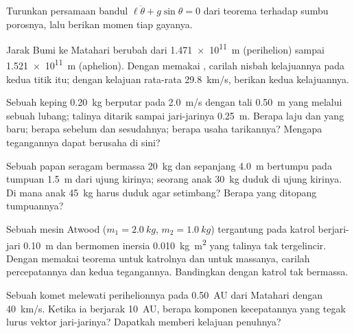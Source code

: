 \begin{exercise}[$\star\star$]\label{exo:b1:angular-momentum:5}
Turunkan persamaan bandul $\ell\ddot\theta + g\sin\theta = 0$ dari
teorema  terhadap sumbu porosnya, lalu berikan momen tiap
gayanya.
\end{exercise}

\begin{exercise}[$\star\star$]\label{exo:b1:angular-momentum:6}
Jarak Bumi ke Matahari berubah dari \qty{1.471e11}{m} (perihelion)
sampai \qty{1.521e11}{m} (aphelion). Dengan memakai ,
carilah nisbah kelajuannya pada kedua titik itu; dengan kelajuan
rata-rata \qty{29.8}{km/s}, berikan kedua kelajuannya.
\end{exercise}

\begin{exercise}[$\star\star$]\label{exo:b1:angular-momentum:7}
Sebuah keping \qty{0.20}{kg} berputar pada \qty{2.0}{m/s} dengan tali
\qty{0.50}{m} yang melalui sebuah lubang; talinya ditarik sampai
jari-jarinya \qty{0.25}{m}. Berapa laju dan  yang
baru; berapa  sebelum dan sesudahnya; berapa usaha
tarikannya? Mengapa tegangannya dapat berusaha di sini?
\end{exercise}

\begin{exercise}[$\star\star$]\label{exo:b1:angular-momentum:8}
Sebuah papan seragam bermassa \qty{20}{kg} dan sepanjang \qty{4.0}{m}
bertumpu pada tumpuan \qty{1.5}{m} dari ujung kirinya; seorang anak
\qty{30}{kg} duduk di ujung kirinya. Di mana anak \qty{45}{kg} harus
duduk agar setimbang? Berapa yang ditopang tumpuannya?
\end{exercise}

\begin{exercise}[$\star\star$]\label{exo:b1:angular-momentum:9}
Sebuah mesin Atwood ($m_1 = \qty{2.0}{kg}$, $m_2 = \qty{1.0}{kg}$)
tergantung pada katrol berjari-jari \qty{0.10}{m} dan bermomen inersia
\qty{0.010}{kg.m^2} yang talinya tak tergelincir. Dengan memakai teorema
 untuk katrolnya dan  untuk massanya, carilah
percepatannya dan kedua tegangannya. Bandingkan dengan katrol tak bermassa.
\end{exercise}

\begin{exercise}[$\star\star\star$]\label{exo:b1:angular-momentum:10}
Sebuah komet melewati perihelionnya pada \qty{0.50}{AU} dari Matahari
dengan \qty{40}{km/s}. Ketika ia berjarak \qty{10}{AU}, berapa komponen
kecepatannya yang tegak lurus vektor jari-jarinya? Dapatkah  memberi kelajuan penuhnya?
\end{exercise}

